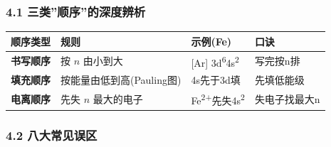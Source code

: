 \documentclass[a4paper,11pt]{ctexart}
\newcounter{none}
\newcommand{\箭}{\ensuremath{\rightarrow}}
\newcommand{\左箭}{\ensuremath{\leftarrow}}
\newcommand{\上箭}{\ensuremath{\uparrow}}
\newcommand{\下箭}{\ensuremath{\downarrow}}
\newcommand{\衡}{\ensuremath{\rightleftharpoons}}
\newcommand{\双箭}{\ensuremath{\leftrightarrow}}
\newcommand{\约等于}{\ensuremath{\approx}}
\newcommand{\小于等于}{\ensuremath{\leq}}
\newcommand{\大于等于}{\ensuremath{\geq}}
\newcommand{\不等于}{\ensuremath{\neq}}
\newcommand{\西格马}{\ensuremath{\sigma}}
\newcommand{\派}{\ensuremath{\pi}}
\begin{document}
\subsubsection{4.1 三类''顺序''的深度辨析}\label{ux4e09ux7c7bux987aux5e8fux7684ux6df1ux5ea6ux8fa8ux6790}

{\def\LTcaptype{none} %
\begin{longtable}[]{@{}
  >{\raggedright\arraybackslash}p{}
  >{\raggedright\arraybackslash}p{}
  >{\raggedright\arraybackslash}p{}
  >{\raggedleft\arraybackslash}p{}@{}}
\toprule\noalign{}
\begin{minipage}[b]{\linewidth}\raggedright
顺序类型
\end{minipage} & \begin{minipage}[b]{\linewidth}\raggedright
规则
\end{minipage} & \begin{minipage}[b]{\linewidth}\raggedright
示例(Fe)
\end{minipage} & \begin{minipage}[b]{\linewidth}\raggedleft
口诀
\end{minipage} \\
\midrule\noalign{}
\endhead
\bottomrule\noalign{}
\endlastfoot
\textbf{书写顺序} & 按 \(n\) 由小到大 & {[}Ar{]} 3d\textsuperscript{6}4s\textsuperscript{2} & 写完按n排 \\
\textbf{填充顺序} & 按能量由低到高(Pauling图) & 4s先于3d填 & 先填低能级 \\
\textbf{电离顺序} & 先失 \(n\) 最大的电子 & Fe\textsuperscript{2+}先失4s\textsuperscript{2} & 失电子找最大n \\
\end{longtable}
}

\subsubsection{4.2 八大常见误区}\label{ux516bux5927ux5e38ux89c1ux8befux533a}
\end{document}

